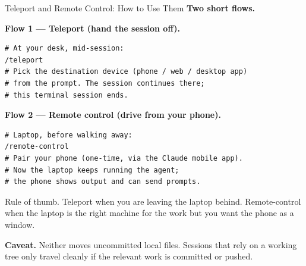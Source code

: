 \documentclass[aspectratio=169, 11pt]{beamer}
\begin{document}
\begin{frame}[fragile]{Teleport and Remote Control: How to Use Them}
  \textbf{Two short flows.}

  \vspace{0.4em}
  \textbf{Flow 1 --- Teleport (hand the session off).}
  \begin{lstlisting}[basicstyle=\ttfamily\footnotesize]
# At your desk, mid-session:
/teleport
# Pick the destination device (phone / web / desktop app)
# from the prompt. The session continues there;
# this terminal session ends.
  \end{lstlisting}

  \vspace{0.3em}
  \textbf{Flow 2 --- Remote control (drive from your phone).}
  \begin{lstlisting}[basicstyle=\ttfamily\footnotesize]
# Laptop, before walking away:
/remote-control
# Pair your phone (one-time, via the Claude mobile app).
# Now the laptop keeps running the agent;
# the phone shows output and can send prompts.
  \end{lstlisting}

  \vspace{0.4em}
  {\small \alert{Rule of thumb.} Teleport when you are leaving the laptop behind. Remote-control when the laptop is the right machine for the work but you want the phone as a window.}

  \vspace{0.2em}
  {\small \textbf{Caveat.} Neither moves uncommitted local files. Sessions that rely on a working tree only travel cleanly if the relevant work is committed or pushed.}
\end{frame}
\end{document}
